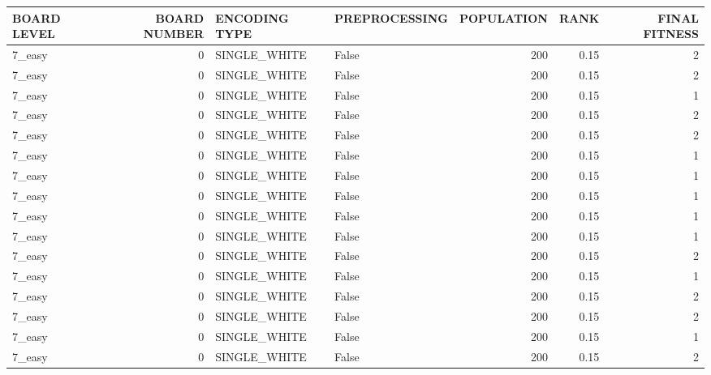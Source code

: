 \begin{tabular}{lrllrrr}
\hline
 BOARD LEVEL   &   BOARD NUMBER & ENCODING TYPE   & PREPROCESSING   &   POPULATION &   RANK &   FINAL FITNESS \\
\hline
 7\_easy        &              0 & SINGLE\_WHITE    & False           &          200 &   0.15 &               2 \\
 7\_easy        &              0 & SINGLE\_WHITE    & False           &          200 &   0.15 &               2 \\
 7\_easy        &              0 & SINGLE\_WHITE    & False           &          200 &   0.15 &               1 \\
 7\_easy        &              0 & SINGLE\_WHITE    & False           &          200 &   0.15 &               2 \\
 7\_easy        &              0 & SINGLE\_WHITE    & False           &          200 &   0.15 &               2 \\
 7\_easy        &              0 & SINGLE\_WHITE    & False           &          200 &   0.15 &               1 \\
 7\_easy        &              0 & SINGLE\_WHITE    & False           &          200 &   0.15 &               1 \\
 7\_easy        &              0 & SINGLE\_WHITE    & False           &          200 &   0.15 &               1 \\
 7\_easy        &              0 & SINGLE\_WHITE    & False           &          200 &   0.15 &               1 \\
 7\_easy        &              0 & SINGLE\_WHITE    & False           &          200 &   0.15 &               1 \\
 7\_easy        &              0 & SINGLE\_WHITE    & False           &          200 &   0.15 &               2 \\
 7\_easy        &              0 & SINGLE\_WHITE    & False           &          200 &   0.15 &               1 \\
 7\_easy        &              0 & SINGLE\_WHITE    & False           &          200 &   0.15 &               2 \\
 7\_easy        &              0 & SINGLE\_WHITE    & False           &          200 &   0.15 &               2 \\
 7\_easy        &              0 & SINGLE\_WHITE    & False           &          200 &   0.15 &               1 \\
 7\_easy        &              0 & SINGLE\_WHITE    & False           &          200 &   0.15 &               2 \\

\end{tabular}
